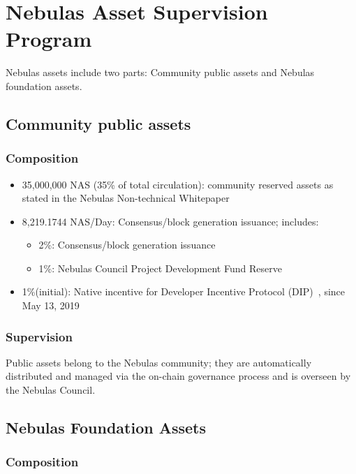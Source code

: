\section{Nebulas Asset Supervision Program}

Nebulas assets include two parts: Community public assets and Nebulas foundation assets.

\subsection{Community public assets}

\subsubsection{Composition}

\begin{itemize}
	\item 35,000,000 NAS (35\% of total circulation): community reserved assets as stated in the Nebulas Non-technical Whitepaper
    \item 8,219.1744 NAS/Day: Consensus/block generation issuance; includes:
	    \begin{itemize}
			\item 2\%: Consensus/block generation issuance
			\item 1\%: Nebulas Council Project Development Fund Reserve
		\end{itemize}
	\item 1\%(initial): Native incentive for Developer Incentive Protocol (DIP)~\cite{mauvepaper}, since May 13, 2019
\end{itemize}

\subsubsection{Supervision}

Public assets belong to the Nebulas community; they are automatically distributed and managed via the on-chain governance process and is overseen by the Nebulas Council.

\subsection{Nebulas Foundation Assets}

\subsubsection{Composition}

